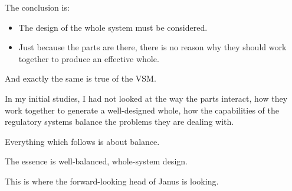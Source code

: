 The conclusion is:

\begin{itemize}
  \item The design of the whole system must be considered.

  \item Just because the parts are there, there is no reason why they should work together to produce an effective whole.

\end{itemize}

And exactly the same is true of the VSM.

In my initial studies, I had not looked at the way the parts interact, how they work together to generate a well-designed whole, how the capabilities of the regulatory systems balance the problems they are dealing with.

Everything which follows is about balance.

The essence is well-balanced, whole-system design.

This is where the forward-looking head of Janus is looking.